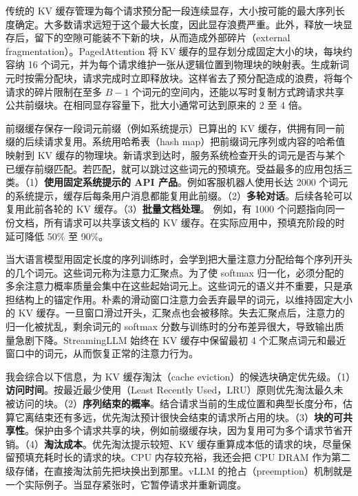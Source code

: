\begin{interview}
传统的 KV 缓存管理为每个请求预分配一段连续显存，大小按可能的最大序列长度确定。大多数请求远短于这个最大长度，因此显存浪费严重。此外，释放一块显存后，留下的空隙可能装不下新的块，从而造成外部碎片（external fragmentation）。PagedAttention 将 KV 缓存的显存划分成固定大小的块，每块约容纳 16 个词元，并为每个请求维护一张从逻辑位置到物理块的映射表。生成新词元时按需分配块，请求完成时立即释放块。这样省去了预分配造成的浪费，将每个请求的碎片限制在至多 \(B-1\) 个词元的空间内，还能以写时复制方式跨请求共享公共前缀块。在相同显存容量下，批大小通常可达到原来的 \(2\) 至 \(4\) 倍。

前缀缓存保存一段词元前缀（例如系统提示）已算出的 KV 缓存，供拥有同一前缀的后续请求复用。系统用哈希表（hash map）把前缀词元序列或内容的哈希值映射到 KV 缓存的物理块。新请求到达时，服务系统检查开头的词元是否与某个已缓存前缀匹配。若匹配，就可以跳过这些词元的预填充。受益最多的应用包括三类。（1）\textbf{使用固定系统提示的 API 产品}。例如客服机器人使用长达 2000 个词元的系统提示，缓存后每条用户消息都能复用此前缀。（2）\textbf{多轮对话}。后续各轮可以复用此前各轮的 KV 缓存。（3）\textbf{批量文档处理}。
例如，有 1000 个问题指向同一份文档，所有请求可以共享该文档的 KV 缓存。在实际应用中，预填充阶段的时延可降低 50\% 至 90\%。

当大语言模型用固定长度的序列训练时，会学到把大量注意力分配给每个序列开头的几个词元。这些词元称为注意力汇聚点。为了使 softmax 归一化，必须分配的多余注意力概率质量会集中在这些起始词元上。这些词元的语义并不重要，只是承担结构上的锚定作用。朴素的滑动窗口注意力会丢弃最早的词元，以维持固定大小的 KV 缓存。一旦窗口滑过开头，汇聚点也会被移除。失去汇聚点后，注意力的归一化被扰乱，剩余词元的 softmax 分数与训练时的分布差异很大，导致输出质量急剧下降。StreamingLLM 始终在 KV 缓存中保留最初 4 个汇聚点词元和最近窗口中的词元，从而恢复正常的注意力行为。

我会综合以下信息，为 KV 缓存淘汰（cache eviction）的候选块确定优先级。（1）\textbf{访问时间}。按最近最少使用（Least Recently Used，LRU）原则优先淘汰最久未被访问的块。（2）\textbf{序列结束的概率}。结合请求当前的生成位置和典型长度分布，估算它离结束还有多远，优先淘汰预计很快会结束的请求所占用的块。（3）\textbf{块的可共享性}。保护由多个请求共享的块，例如前缀缓存块，因为复用可为多个请求节省开销。（4）\textbf{淘汰成本}。优先淘汰提示较短、KV 缓存重算成本低的请求的块，尽量保留预填充耗时长的请求的块。CPU 内存较充裕，我还会把 CPU DRAM 作为第二级存储，在直接淘汰前先把块换出到那里。vLLM 的抢占（preemption）机制就是一个实际例子。当显存紧张时，它暂停请求并重新调度。


\end{interview}
